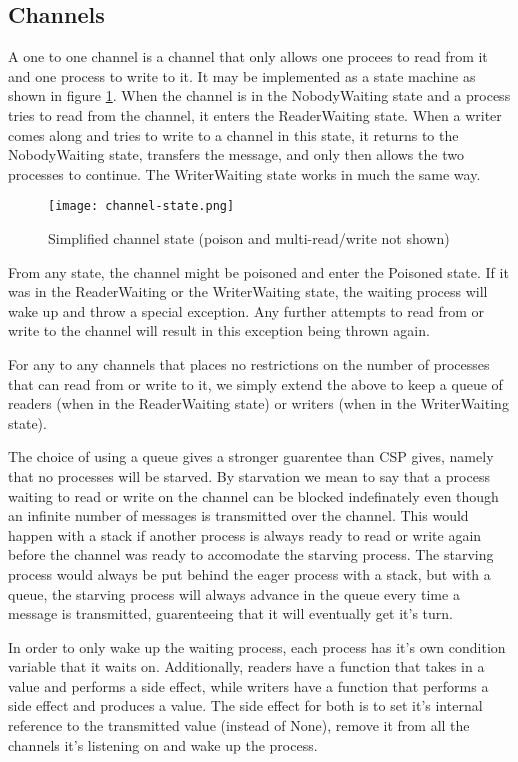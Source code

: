\documentclass[a4paper,12pt]{article}
\begin{document}
\subsection{Channels}
A one to one channel is a channel that only allows one procees to read from it and one process 
to write to it. It may be implemented as a state machine as shown in figure \ref{channel-state}.
When the channel is in the NobodyWaiting state and a process tries to read from the channel,
it enters the ReaderWaiting state. When a writer comes along and tries to write to a channel
in this state, it returns to the NobodyWaiting state, transfers the message, and only then
allows the two processes to continue. The WriterWaiting state works in much the same way.

\begin{figure}[h]
\centering
\texttt{[image: channel-state.png]}
\caption{Simplified channel state (poison and multi-read/write not shown)}
\label{channel-state}
\end{figure}

From any state, the channel might be poisoned and enter the Poisoned state. If it was in the
ReaderWaiting or the WriterWaiting state, the waiting process will wake up and throw a special
exception. Any further attempts to read from or write to the channel will result in this 
exception being thrown again.

For any to any channels that places no restrictions on the number of processes that can read
from or write to it, we simply extend the above to keep a queue of readers (when in the 
ReaderWaiting state) or writers (when in the WriterWaiting state).

The choice of using a queue gives a stronger guarentee than CSP gives, namely that no processes
will be starved. By starvation we mean to say that a process waiting to read or write on the
channel can be blocked indefinately even though an infinite number of messages is transmitted
over the channel. This would happen with a stack if another process is always ready to read or 
write again before the channel was ready to accomodate the starving process. The starving process
would always be put behind the eager process with a stack, but with a queue, the starving process
will always advance in the queue every time a message is transmitted, guarenteeing that it will
eventually get it's turn.

In order to only wake up the waiting process, each process has it's own condition variable that
it waits on. Additionally, readers have a function that takes in a value and performs a side 
effect, while writers have a function that performs a side effect and produces a value. The side
effect for both is to set it's internal reference to the transmitted value (instead of None),
remove it from all the channels it's listening on and wake up the process.
\end{document}
